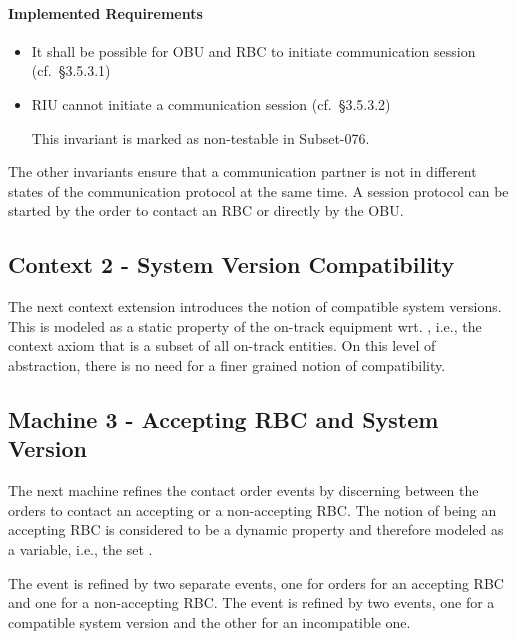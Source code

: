 \documentclass{template/openetcs_article}
\begin{document}
\paragraph{Implemented Requirements}
\label{sec:impl-requ-1}

\begin{itemize}
\item It shall be possible for OBU and RBC to initiate communication session
  (cf.~§3.5.3.1)
\item RIU cannot initiate a communication session (cf.~§3.5.3.2)

This invariant is marked as non-testable in Subset-076.
\end{itemize}

The other invariants ensure that a communication partner is not in different
states of the communication protocol at the same time. A session protocol can be
started by the order to contact an RBC or directly by the OBU.



\subsection{Context 2 - System Version Compatibility}
\label{sec:context-2-system}

The next context extension introduces the notion of compatible system
versions. This is modeled as a static property of the on-track equipment
wrt. , i.e., the context axiom that
 is a subset of all on-track entities. On this
level of abstraction, there is no need for a finer grained notion of
compatibility.



\subsection{Machine 3 - Accepting RBC and System Version}
\label{sec:machine-3-accepting}

The next machine refines the contact order events by discerning between the
orders to contact an accepting or a non-accepting RBC. The notion of being an
accepting RBC is considered to be a dynamic property and therefore modeled as a
variable, i.e., the set .

The  event is refined by two separate events, one
for orders for an accepting RBC and one for a non-accepting RBC. The
 event is refined by two events, one for a
compatible system version and the other for an incompatible one.
\end{document}
